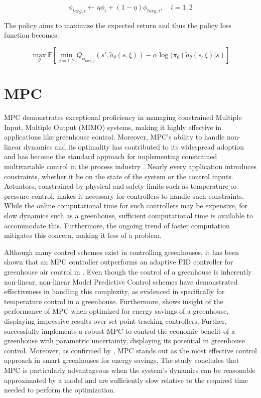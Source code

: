 \begin{equation}
	\phi_{targ,i} \leftarrow \eta \phi_{i} + (1-\eta)\phi_{targ,i}, \quad i = 1,2
\end{equation}


The policy aims to maximize the expected return and thus the policy loss function becomes:

\begin{equation}
	\max_{\theta} \mathbb{E} \left[\min_{j = 1,2} Q_{\phi_{targ,j}}(s', \tilde{a}_{\theta} (s, \xi)) - \alpha \log (\pi_\theta (\tilde{a}_{\theta} (s, \xi)| s)    \right]
\end{equation}


\section{MPC}\label{section:MPC}
MPC demonstrates exceptional proficiency in managing constrained Multiple Input, Multiple Output (MIMO) systems, making it highly effective in applications like greenhouse control. Moreover, MPC's ability to handle non-linear dynamics and its optimality has contributed to its widespread adoption and has become the standard approach for implementing constrained multivariable control in the process industry \cite{daiDiscreteTimeModelPredictive2012}. Nearly every application introduces constraints, whether it be on the state of the system or the control inputs. Actuators, constrained by physical and safety limits such as temperature or pressure control, makes it necessary for controllers to handle such constraints. While the online computational time for such controllers may be expensive, for slow dynamics such as a greenhouse, sufficient computational time is available to accommodate this. Furthermore, the ongoing trend of faster computation mitigates this concern, making it less of a problem.

Although many control schemes exist in controlling greenhouses, it has been shown that an MPC controller outperforms an adaptive PID controller for greenhouse air control in \cite{ghoumariNonlinearConstrainedMPC2005}. Even though the control of a greenhouse is inherently non-linear, non-linear Model Predictive Control schemes have demonstrated effectiveness in handling this complexity, as evidenced in \cite{gruberNonlinearMPCBased2011, montoyaHybridcontrolledApproachMaintaining2016} specifically for temperature control in a greenhouse. Furthermore, \cite{bersaniModelPredictiveControl2020} shows insight of the performance of MPC when optimized for energy savings of a greenhouse, displaying impressive results over set-point tracking controllers. Further, \cite{boersmaRobustSamplebasedModel2022} successfully implements a robust MPC to control the economic benefit of a greenhouse with parametric uncertainty, displaying its potential in greenhouse control. Moreover, as confirmed by \cite{bersaniModelPredictiveControl2020}, MPC stands out as the most effective control approach in smart greenhouses for energy savings. The study concludes that MPC is particularly advantageous when the system's dynamics can be reasonable approximated by a model and are sufficiently slow relative to the required time needed to perform the optimization.

